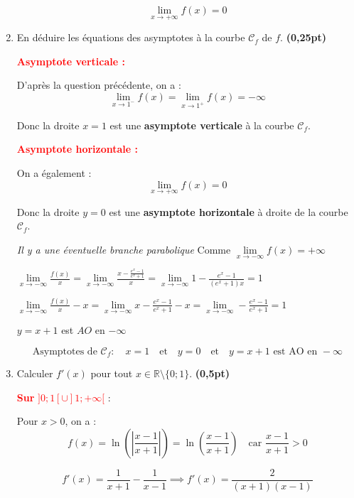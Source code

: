 \documentclass[12pt,a4paper]{article}
\begin{document}
\begin{enumerate}
\begin{resultbox}
\[
\boxed{\lim_{x \to +\infty} f(x) = 0}
\]
\end{resultbox}

\item En déduire les équations des asymptotes à la courbe \( \mathscr{C}_f \) de \( f \). \hfill \textbf{(0,25pt)}

\textcolor{red}{\textbf{Asymptote verticale :}}

D’après la question précédente, on a :
\[
\lim_{x \to 1^-} f(x) = \lim_{x \to 1^+} f(x) = -\infty
\]

Donc la droite \( x = 1 \) est une \textbf{asymptote verticale} à la courbe \( \mathscr{C}_f \).

\vspace{0.5em}
\textcolor{red}{\textbf{Asymptote horizontale :}}

On a également :
\[
\lim_{x \to +\infty} f(x) = 0
\]

Donc la droite \( y = 0 \) est une \textbf{asymptote horizontale} à droite de la courbe \( \mathscr{C}_f \).

\textit{Il y a une éventuelle branche parabolique } Comme \( \lim\limits_{x\to -\infty} f(x)= +\infty \)

\( \lim\limits_{x\to -\infty} \frac{f(x)}{x} = \lim\limits_{x\to -\infty} \frac{x-\frac{e^x-1}{e^x +1}}{x}=\lim\limits_{x\to -\infty} 1-\frac{e^x-1}{(e^x +1)x} = 1\)

\( \lim\limits_{x\to -\infty} \frac{f(x)}{x} - x= \lim\limits_{x\to -\infty} x-\frac{e^x-1}{e^x +1}-x=\lim\limits_{x\to -\infty} -\frac{e^x-1}{e^x +1} = 1\)

\(y=x+1\) est \(AO\) en \(-\infty\)

\begin{resultbox}
\[
\boxed{
\text{Asymptotes de } \mathscr{C}_f :
\quad x = 1 \quad \text{et} \quad y = 0 \quad \text{et} \quad y=x+1 \text{ est AO en }  -\infty}
\]
\end{resultbox}

\item Calculer \( f'(x) \) pour tout \( x \in \mathbb{R} \setminus \{0 ; 1\} \). \hfill \textbf{(0,5pt)}

\textcolor{red}{\textbf{Sur } \( ]0 ; 1[ \cup ]1 ; +\infty[ \)} :

Pour \( x > 0 \), on a :
\[
f(x) = \ln\left( \left| \frac{x - 1}{x + 1} \right| \right) = \ln\left( \frac{x - 1}{x + 1} \right) \quad \text{car } \frac{x - 1}{x + 1} > 0
\]

\[
f'(x) = \frac{1}{x+1} - \frac{1}{x-1}\implies  f'(x) =\frac{2}{(x + 1)(x - 1)}
\]


\end{enumerate}
\end{document}
